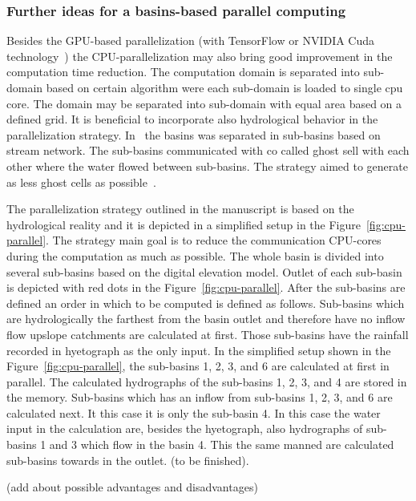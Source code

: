 \subsubsection{Further ideas for a basins-based parallel computing}
Besides the GPU-based parallelization (with TensorFlow \cite{xxx} or NVIDIA Cuda technology~\cite{Kalyanapu2011,Le2015}) the CPU-parallelization may also bring good improvement in the computation time reduction. The computation domain is separated into sub-domain based on certain algorithm were each sub-domain is loaded to single cpu core. The domain may be separated into sub-domain with equal area based on a defined grid. It is beneficial to incorporate also hydrological behavior  in the parallelization strategy. In~\cite{Vivoni2011} the basins was separated in sub-basins based on stream network. The sub-basins communicated with co called ghost sell with each other where the water flowed between sub-basins. The strategy aimed to generate as less ghost cells as possible~\cite{Vivoni2011}.

The parallelization strategy outlined in the manuscript is based on the hydrological reality and it is depicted in a simplified setup in the Figure~\ref{fig:cpu-parallel}. The strategy main goal is to reduce the communication CPU-cores during the computation as much as possible. The whole basin is divided into several sub-basins based on the digital elevation model. Outlet of each sub-basin is depicted with red dots in the Figure~\ref{fig:cpu-parallel}. After the sub-basins are defined an order in which to be computed is defined as follows. Sub-basins which are hydrologically the farthest from the basin outlet and therefore have no inflow flow upslope catchments are calculated at first. Those sub-basins have the rainfall recorded in hyetograph as the only input. In the simplified setup shown in the Figure~\ref{fig:cpu-parallel}, the sub-basins 1, 2, 3, and 6 are calculated at first in parallel. The calculated hydrographs of the sub-basins 1, 2, 3, and 4 are stored in the memory. Sub-basins which has an inflow from sub-basins 1, 2, 3, and 6 are calculated next. It this case it is only the sub-basin 4. In this case the water input in the calculation are, besides the hyetograph, also hydrographs of sub-basins 1 and 3 which flow in the basin 4. This the same manned are calculated sub-basins towards in the outlet. (to be finished).

(add about possible advantages and disadvantages)

